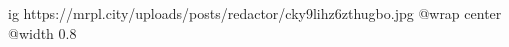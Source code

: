  
 
 
 
 

\ifcmt
  ig https://mrpl.city/uploads/posts/redactor/cky9lihz6zthugbo.jpg
  @wrap center
  @width 0.8
\fi
